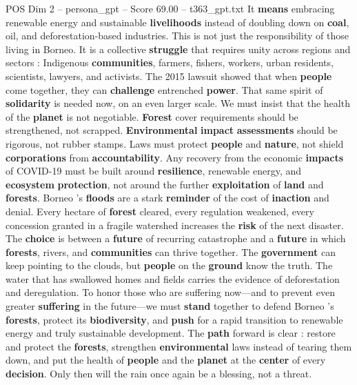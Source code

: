 \begin{textsample}{POS Dim 2 – persona\_gpt – Score 69.00 – t363\_gpt.txt}
It \textbf{means} embracing renewable energy and sustainable \textbf{livelihoods} instead of doubling down on \textbf{coal}, oil, and deforestation-based industries.
This is not just the responsibility of those living in Borneo.
It is a collective \textbf{struggle} that requires unity across regions and sectors : Indigenous \textbf{communities}, farmers, fishers, workers, urban residents, scientists, lawyers, and activists.
The 2015 lawsuit showed that when \textbf{people} come together, they can \textbf{challenge} entrenched \textbf{power}.
That same spirit of \textbf{solidarity} is needed now, on an even larger scale.
We must insist that the health of the \textbf{planet} is not negotiable. \textbf{Forest} cover requirements should be strengthened, not scrapped. \textbf{Environmental} \textbf{impact} \textbf{assessments} should be rigorous, not rubber stamps.
Laws must protect \textbf{people} and \textbf{nature}, not shield \textbf{corporations} from \textbf{accountability}.
Any recovery from the economic \textbf{impacts} of COVID-19 must be built around \textbf{resilience}, renewable energy, and \textbf{ecosystem} \textbf{protection}, not around the further \textbf{exploitation} of \textbf{land} and \textbf{forests}.
Borneo ’s \textbf{floods} are a stark \textbf{reminder} of the cost of \textbf{inaction} and denial.
Every hectare of \textbf{forest} cleared, every regulation weakened, every concession granted in a fragile watershed increases the \textbf{risk} of the next disaster.
The \textbf{choice} is between a \textbf{future} of recurring catastrophe and a \textbf{future} in which \textbf{forests}, rivers, and \textbf{communities} can thrive together.
The \textbf{government} can keep pointing to the clouds, but \textbf{people} on the \textbf{ground} know the truth.
The water that has swallowed homes and fields carries the evidence of deforestation and deregulation.
To honor those who are suffering now—and to prevent even greater \textbf{suffering} in the future—we must \textbf{stand} together to defend Borneo ’s \textbf{forests}, protect its \textbf{biodiversity}, and \textbf{push} for a rapid transition to renewable energy and truly sustainable development.
The \textbf{path} forward is clear : restore and protect the \textbf{forests}, strengthen \textbf{environmental} laws instead of tearing them down, and put the health of \textbf{people} and the \textbf{planet} at the \textbf{center} of every \textbf{decision}.
Only then will the rain once again be a blessing, not a threat.


\end{textsample}
